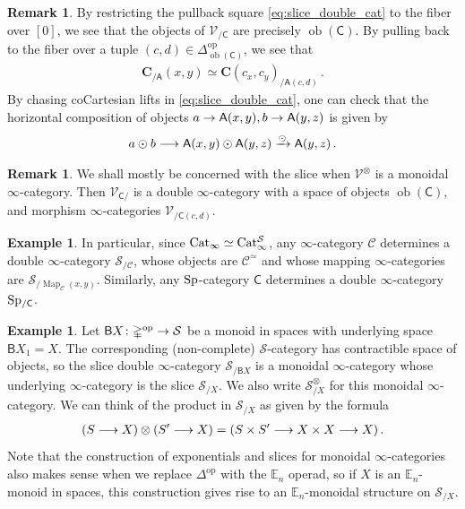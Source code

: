 \documentclass[10pt]{amsart}
\numberwithin{equation}{section}
\theoremstyle{definition}
\newtheorem{ex}[prop]{Example}
\newtheorem{rem}[prop]{Remark}
\DeclareMathOperator{\Map}{Map}
\DeclareMathOperator{\ob}{ob}
\DeclareMathOperator{\op}{op}
\newcommand{\Cat}{\mathrm{Cat}\vphantom{t}}
\newcommand{\bE}{\mathbb{E}}
\newcommand{\Simp}{\mathbb{\Delta}}
\newcommand{\cC}{\mathcal{C}}
\newcommand{\cS}{\mathcal{S}}
\newcommand{\cV}{\mathcal{V}}
\newcommand{\bfC}{\mathbf{C}}
\newcommand{\sfA}{\mathsf{A}}
\newcommand{\sfB}{\mathsf{B}}
\newcommand{\sfC}{\mathsf{C}}
\newcommand{\Sp}{\mathrm{Sp}\vphantom{p}}
\renewcommand{\to}{\mathchoice{\longrightarrow}{\rightarrow}{}{}}
\begin{document}
	\begin{rem}\label{rem:unwinding_slice}
		By restricting the pullback square \eqref{eq:slice_double_cat} to the fiber over $[0]$, we see that the objects of $\cV_{/ \sfC}$ are precisely $\ob(\sfC)$.
    By pulling back to the fiber over a tuple $(c,d) \in \Simp^{\op}_{\ob(\sfC)}$, we see that
		\begin{align*}
			\bfC_{/\sfA}(x,y) \simeq \bfC(c_{x},c_{y})_{/\sfA(c,d)} \,.
		\end{align*}
		By chasing coCartesian lifts in \eqref{eq:slice_double_cat}, one can check that the horizontal composition of objects $a\to \sfA(x,y), b\to \sfA(y,z)$ is given by
		\begin{align*}
			a\odot b \to \sfA(x,y) \odot \sfA(y,z) \xrightarrow{\odot} \sfA(y,z) \,.
		\end{align*}
	\end{rem}

	\begin{rem}\label{rem:monoidal_slice}
		We shall mostly be concerned with the slice when $\cV^{\otimes}$ is a monoidal $\infty$-category.
    Then $\cV_{\sfC/}$ is a double $\infty$-category with a space of objects $\ob(\sfC)$, and morphism $\infty$-categories $\cV_{/ \sfC(c,d)}$.
	\end{rem}


	\begin{ex}
		In particular, since $\Cat_\infty \simeq \Cat_\infty^{\cS}$, any $\infty$-category $\cC$ determines a double $\infty$-category $\cS_{/\cC}$, whose objects are $\cC^{\simeq}$ and whose mapping $\infty$-categories are $\cS_{/\Map_{\cC}(x,y)}$. Similarly, any $\Sp$-category $\sfC$ determines a double $\infty$-category $\Sp_{/\sfC}$.
	\end{ex}

	\begin{ex}\label{ex:2cat_from_monoid}
		Let $\sfB X \colon \Simp^{\op} \to \cS$ be a monoid in spaces with underlying space $\sfB X_{1} = X$. The corresponding (non-complete) $\cS$-category has contractible space of objects, so the slice double $\infty$-category $\cS_{/\sfB X}$ is a monoidal $\infty$-category whose underlying $\infty$-category is the slice $\cS_{/X}$. We also write $\cS_{/X}^{\otimes}$ for this monoidal $\infty$-category. We can think of the product in $\cS_{/X}$ as given by the formula
		\begin{align*}
			(S \to X) \otimes (S'\to X) = (S\times S' \to X\times X \to X) \,.
		\end{align*}
		Note that the construction of exponentials and slices for monoidal $\infty$-categories also makes sense when we replace $\Simp^{\op}$ with the $\bE_{n}$ operad, so if $X$ is an $\bE_{n}$-monoid in spaces, this construction gives rise to an $\bE_{n}$-monoidal structure on $\cS_{/X}$.
	\end{ex}
\end{document}
